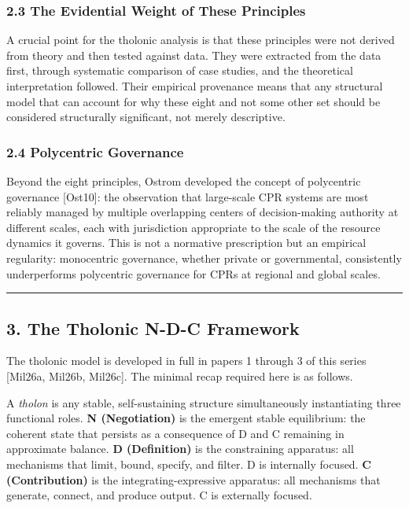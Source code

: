 \documentclass[
  11pt,
  letterpaper,
]{article}
\begin{document}
\subsubsection{2.3 The Evidential Weight of These
Principles}\label{the-evidential-weight-of-these-principles}

A crucial point for the tholonic analysis is that these principles were
not derived from theory and then tested against data. They were
extracted from the data first, through systematic comparison of case
studies, and the theoretical interpretation followed. Their empirical
provenance means that any structural model that can account for why
these eight and not some other set should be considered structurally
significant, not merely descriptive.

\subsubsection{2.4 Polycentric Governance}\label{polycentric-governance}

Beyond the eight principles, Ostrom developed the concept of polycentric
governance {[}Ost10{]}: the observation that large-scale CPR systems are
most reliably managed by multiple overlapping centers of decision-making
authority at different scales, each with jurisdiction appropriate to the
scale of the resource dynamics it governs. This is not a normative
prescription but an empirical regularity: monocentric governance,
whether private or governmental, consistently underperforms polycentric
governance for CPRs at regional and global scales.

\begin{center}\rule{0.5\linewidth}{0.5pt}\end{center}

\subsection{3. The Tholonic N-D-C
Framework}\label{the-tholonic-n-d-c-framework}

The tholonic model is developed in full in papers 1 through 3 of this
series {[}Mil26a, Mil26b, Mil26c{]}. The minimal recap required here is
as follows.

A \emph{tholon} is any stable, self-sustaining structure simultaneously
instantiating three functional roles. \textbf{N (Negotiation)} is the
emergent stable equilibrium: the coherent state that persists as a
consequence of D and C remaining in approximate balance. \textbf{D
(Definition)} is the constraining apparatus: all mechanisms that limit,
bound, specify, and filter. D is internally focused. \textbf{C
(Contribution)} is the integrating-expressive apparatus: all mechanisms
that generate, connect, and produce output. C is externally focused.
\end{document}
